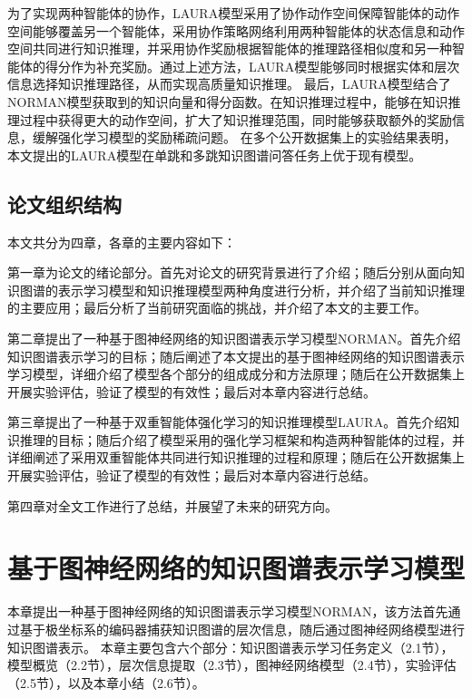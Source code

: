 \documentclass[algorithmlist, AutoFakeBold, AutoFakeSlant, figurelist, tablelist, nomlist, engineering]{seuthesix}
\begin{document}
\begin{itemize}
  为了实现两种智能体的协作，LAURA模型采用了协作动作空间保障智能体的动作空间能够覆盖另一个智能体，采用协作策略网络利用两种智能体的状态信息和动作空间共同进行知识推理，并采用协作奖励根据智能体的推理路径相似度和另一种智能体的得分作为补充奖励。通过上述方法，LAURA模型能够同时根据实体和层次信息选择知识推理路径，从而实现高质量知识推理。
  最后，LAURA模型结合了NORMAN模型获取到的知识向量和得分函数。在知识推理过程中，能够在知识推理过程中获得更大的动作空间，扩大了知识推理范围，同时能够获取额外的奖励信息，缓解强化学习模型的奖励稀疏问题。
  在多个公开数据集上的实验结果表明，本文提出的LAURA模型在单跳和多跳知识图谱问答任务上优于现有模型。
\end{itemize}

\section{论文组织结构}
本文共分为四章，各章的主要内容如下：

第一章为论文的绪论部分。首先对论文的研究背景进行了介绍；随后分别从面向知识图谱的表示学习模型和知识推理模型两种角度进行分析，并介绍了当前知识推理的主要应用；最后分析了当前研究面临的挑战，并介绍了本文的主要工作。

第二章提出了一种基于图神经网络的知识图谱表示学习模型NORMAN。首先介绍知识图谱表示学习的目标；随后阐述了本文提出的基于图神经网络的知识图谱表示学习模型，详细介绍了模型各个部分的组成成分和方法原理；随后在公开数据集上开展实验评估，验证了模型的有效性；最后对本章内容进行总结。

第三章提出了一种基于双重智能体强化学习的知识推理模型LAURA。首先介绍知识推理的目标；随后介绍了模型采用的强化学习框架和构造两种智能体的过程，并详细阐述了采用双重智能体共同进行知识推理的过程和原理；随后在公开数据集上开展实验评估，验证了模型的有效性；最后对本章内容进行总结。

第四章对全文工作进行了总结，并展望了未来的研究方向。


\chapter{基于图神经网络的知识图谱表示学习模型}
本章提出一种基于图神经网络的知识图谱表示学习模型NORMAN，该方法首先通过基于极坐标系的编码器捕获知识图谱的层次信息，随后通过图神经网络模型进行知识图谱表示。
本章主要包含六个部分：知识图谱表示学习任务定义（2.1节），模型概览（2.2节），层次信息提取（2.3节），图神经网络模型（2.4节），实验评估（2.5节），以及本章小结（2.6节）。
\end{document}
